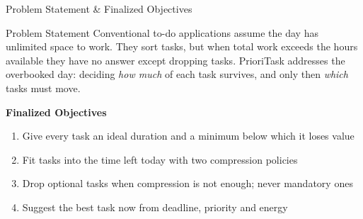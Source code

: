\documentclass[aspectratio=169,11pt]{beamer}
\begin{document}
\begin{frame}{Problem Statement \& Finalized Objectives}

\begin{block}{Problem Statement}
\small
Conventional to-do applications assume the day has unlimited space to work. They sort
tasks, but when total work exceeds the hours available they have no answer except
dropping tasks. PrioriTask addresses the overbooked day: deciding \emph{how much}
of each task survives, and only then \emph{which} tasks must move.
\end{block}

\vspace{2mm}

\textbf{\color{GEUBlue}Finalized Objectives}

\begin{enumerate}\itemsep3pt
\small
\item Give every task an ideal duration and a minimum below which it loses value
\item Fit tasks into the time left today with two compression policies
\item Drop optional tasks when compression is not enough; never mandatory ones
\item Suggest the best task now from deadline, priority and energy
\end{enumerate}

\vfill


\end{frame}
\end{document}

